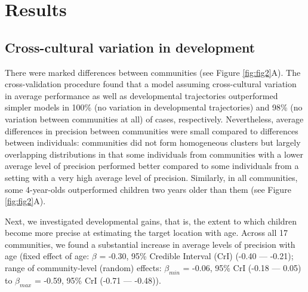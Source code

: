 \documentclass[
  man,floatsintext]{apa7}
\begin{document}
\hypertarget{results}{%
\section{Results}\label{results}}

\hypertarget{cross-cultural-variation-in-development}{%
\subsection{Cross-cultural variation in development}\label{cross-cultural-variation-in-development}}

There were marked differences between communities (see Figure \ref{fig:fig2}A). The cross-validation procedure found that a model assuming cross-cultural variation in average performance as well as developmental trajectories outperformed simpler models in 100\% (no variation in developmental trajectories) and 98\% (no variation between communities at all) of cases, respectively. Nevertheless, average differences in precision between communities were small compared to differences between individuals: communities did not form homogeneous clusters but largely overlapping distributions in that some individuals from communities with a lower average level of precision performed better compared to some individuals from a setting with a very high average level of precision. Similarly, in all communities, some 4-year-olds outperformed children two years older than them (see Figure \ref{fig:fig2}A).

Next, we investigated developmental gains, that is, the extent to which children become more precise at estimating the target location with age. Across all 17 communities, we found a substantial increase in average levels of precision with age (fixed effect of age: \(\beta\) = -0.30, 95\% Credible Interval (CrI) (-0.40 --- -0.21); range of community-level (random) effects: \(\beta_{min}\) = -0.06, 95\% CrI (-0.18 --- 0.05) to \(\beta_{max}\) = -0.59, 95\% CrI (-0.71 --- -0.48)).
\end{document}
